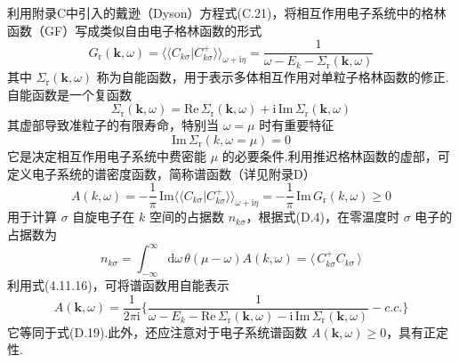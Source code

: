 利用附录C中引入的戴逊（Dyson）方程式(C.21)，将相互作用电子系统中的格林函数（GF）写成类似自由电子格林函数的形式
\begin{equation}
  G_{\mathrm{r}}(\boldsymbol{k},\omega)
  =\langle\langle C_{k\sigma}|C_{k\sigma}^{+}\rangle\rangle_{\omega+\mathrm{i}\eta}
  =\frac{1}{\omega-E_{k}-\varSigma_{\mathrm{r}}(\boldsymbol{k},\omega)}
\end{equation}
其中 $\varSigma_{\mathrm{r}}(\boldsymbol{k},\omega)$ 称为自能函数，用于表示多体相互作用对单粒子格林函数的修正.自能函数是一个复函数
\begin{equation}
  \varSigma_{\mathrm{r}}(\boldsymbol{k},\omega)
  =\mathrm{Re}\,\varSigma_{\mathrm{r}}(\boldsymbol{k},\omega)
  +\mathrm{i}\,\mathrm{Im}\,\varSigma_{\mathrm{r}}(\boldsymbol{k},\omega)
\end{equation}
其虚部导致准粒子的有限寿命，特别当 $\omega=\mu$ 时有重要特征
\begin{equation}
  \mathrm{Im}\,\varSigma_{\mathrm{r}}(k,\omega=\mu)=0
\end{equation}
它是决定相互作用电子系统中费密能 $\mu$ 的必要条件.利用推迟格林函数的虚部，可定义电子系统的谱密度函数，简称谱函数（详见附录D）
\begin{equation}
  A(k,\omega)=-\frac{1}{\pi}\,
  \mathrm{Im}\langle\langle C_{k\sigma}|C_{k\sigma}^{+}\rangle\rangle_{\omega+\mathrm{i}\eta}
  =-\frac{1}{\pi}\,\mathrm{Im}\,G_{\mathrm{r}}(k,\omega)\geqslant 0
\end{equation}
用于计算 $\sigma$ 自旋电子在 $k$ 空间的占据数 $n_{k\sigma}$，根据式(D.4)，在零温度时 $\sigma$ 电子的占据数为
\begin{equation}
  n_{k\sigma}=\int_{-\infty}^{\infty}\mathrm{d}\omega\,
  \theta\left(\mu-\omega\right)A(k,\omega)
  =\langle\,C_{k\sigma}^{+}C_{k\sigma}\,\rangle
\end{equation}
利用式(4.11.16)，可将谱函数用自能表示
\begin{equation}
  A(\boldsymbol{k},\omega)=\frac{1}{2\pi\mathrm{i}}
  \bigg\{\frac{1}{\omega-E_{k}-\mathrm{Re}\,\varSigma_{\mathrm{r}}(\boldsymbol{k},\omega)
  -\mathrm{i}\,\mathrm{Im}\,\varSigma_{\mathrm{r}}(\boldsymbol{k},\omega)}
  -c.c.\bigg\}
\end{equation}
它等同于式(D.19).此外，还应注意对于电子系统谱函数 $A(\boldsymbol{k},\omega)\geqslant 0$，具有正定性.

